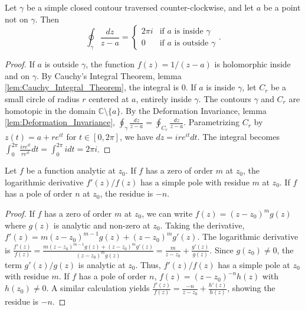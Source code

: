\begin{lemma}
    \label{lem:Cauchy_Integral_Formula_for_a_Simple_Pole}
    Let $\gamma$ be a simple closed contour traversed counter-clockwise, and let $a$ be a point not on $\gamma$. Then
    $$ \oint_\gamma \frac{dz}{z-a} = \begin{cases} 2\pi i & \text{if } a \text{ is inside } \gamma \\ 0 & \text{if } a \text{ is outside } \gamma \end{cases}. $$
\end{lemma}

\begin{proof}
    If $a$ is outside $\gamma$, the function $f(z) = 1/(z-a)$ is holomorphic inside and on $\gamma$. By Cauchy's Integral Theorem, lemma \ref{lem:Cauchy_Integral_Theorem}, the integral is 0.
    If $a$ is inside $\gamma$, let $C_r$ be a small circle of radius $r$ centered at $a$, entirely inside $\gamma$. The contours $\gamma$ and $C_r$ are homotopic in the domain $\mathbb{C} \setminus \{a\}$. By the Deformation Invariance, lemma \ref{lem:Deformation_Invariance}, $\oint_\gamma \frac{dz}{z-a} = \oint_{C_r} \frac{dz}{z-a}$. Parametrizing $C_r$ by $z(t) = a + re^{it}$ for $t \in [0, 2\pi]$, we have $dz = ire^{it}dt$. The integral becomes $\int_0^{2\pi} \frac{ire^{it}}{re^{it}} dt = \int_0^{2\pi} i dt = 2\pi i$.
\end{proof}

\begin{lemma}
    \label{lem:Residue_of_Logarithmic_Derivative}
    Let $f$ be a function analytic at $z_0$. If $f$ has a zero of order $m$ at $z_0$, the logarithmic derivative $f'(z)/f(z)$ has a simple pole with residue $m$ at $z_0$. If $f$ has a pole of order $n$ at $z_0$, the residue is $-n$.
\end{lemma}

\begin{proof}
    If $f$ has a zero of order $m$ at $z_0$, we can write $f(z)=(z-z_0)^m g(z)$ where $g(z)$ is analytic and non-zero at $z_0$. Taking the derivative, $f'(z) = m(z-z_0)^{m-1}g(z) + (z-z_0)^m g'(z)$. The logarithmic derivative is $\frac{f'(z)}{f(z)} = \frac{m(z-z_0)^{m-1}g(z) + (z-z_0)^m g'(z)}{(z-z_0)^m g(z)} = \frac{m}{z-z_0} + \frac{g'(z)}{g(z)}$. Since $g(z_0)\neq 0$, the term $g'(z)/g(z)$ is analytic at $z_0$. Thus, $f'(z)/f(z)$ has a simple pole at $z_0$ with residue $m$.
    If $f$ has a pole of order $n$, $f(z)=(z-z_0)^{-n} h(z)$ with $h(z_0)\neq 0$. A similar calculation yields $\frac{f'(z)}{f(z)} = \frac{-n}{z-z_0} + \frac{h'(z)}{h(z)}$, showing the residue is $-n$.
\end{proof}

